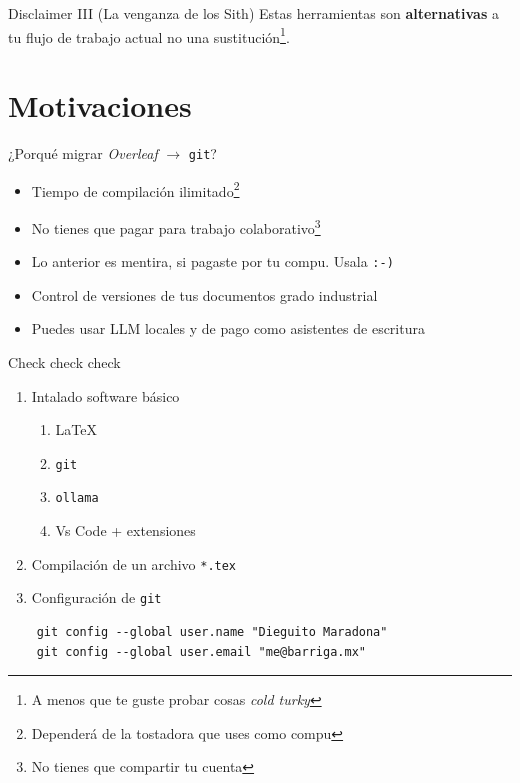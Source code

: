 \documentclass[11pt]{beamer}
\begin{document}
\begin{frame}{Disclaimer III (La venganza de los Sith)}
\Large Estas herramientas son \textbf{alternativas} a tu flujo de trabajo actual no una sustitución\footnote{A menos que te guste probar cosas \textit{cold turky}}.
\end{frame}

\section{Motivaciones}

\begin{frame}{¿Porqué migrar \textit{Overleaf} $\rightarrow$ \texttt{git}?}
	\begin{itemize}
		\item <1-> Tiempo de compilación ilimitado\footnote{Dependerá de la tostadora que uses como compu}
		\item <2-> No tienes que pagar para trabajo colaborativo\footnote{No tienes que compartir tu cuenta}
		\item <3-> Lo anterior es mentira, si pagaste por tu compu. Usala \texttt{:-)}
		\item <4-> Control de versiones de tus documentos grado industrial
		\item <5-> Puedes usar LLM locales y de pago como asistentes de escritura
	\end{itemize}
\end{frame}

\begin{frame}[fragile]{Check check check}
	\begin{enumerate}
		\item Intalado software básico
		\begin{enumerate}
			\item \LaTeX
			\item \texttt{git}
			\item \texttt{ollama}
			\item Vs Code + extensiones
		\end{enumerate}
		\item Compilación de un archivo \texttt{*.tex}
		\item Configuración de \texttt{git}
	\end{enumerate}

	\begin{verbatim}
    git config --global user.name "Dieguito Maradona"
    git config --global user.email "me@barriga.mx"
    \end{verbatim}
\end{frame}
\end{document}
